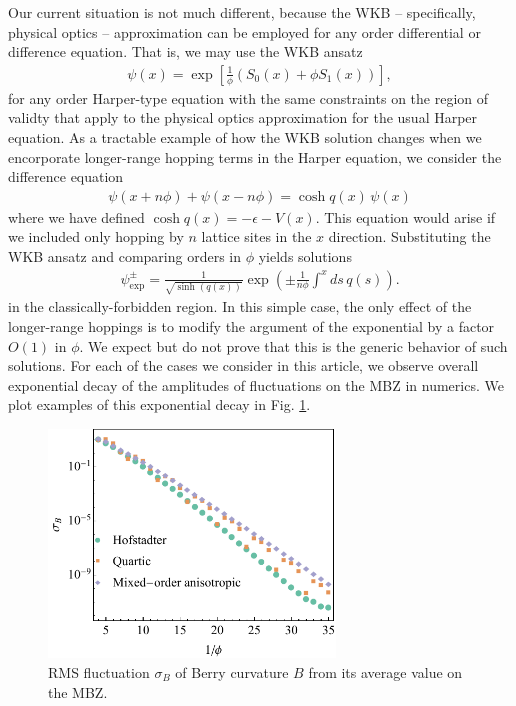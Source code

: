 \documentclass[aps,prb,twocolumn,letterpaper,twoside,nobalancelastpage,groupedaddress,amsmath,amssymb,floatfix,citeautoscript]{revtex4-1}
\begin{document}
Our current situation is not much different, because the WKB -- specifically, physical optics -- approximation can be employed for any order differential or difference equation. That is, we may use the WKB ansatz
\begin{align}
\label{wkb-ansatz}
\psi(x) = \exp\left[\frac{1}{\phi}\left(S_0(x) + \phi S_1(x)\right)\right],
\end{align}
for any order Harper-type equation with the same constraints on the region of validty that apply to the physical optics approximation for the usual Harper equation\cite{bender_advanced_1999}. 
As a tractable example of how the WKB solution changes when we encorporate longer-range hopping terms in the Harper equation, we consider the difference equation
\begin{align*}
\psi(x + n \phi) + \psi(x - n\phi) = \cosh q(x)\,\psi(x)
\end{align*}
where we have defined $\cosh q(x) = -\epsilon - V(x)$.
This equation would arise if we included only hopping by $n$ lattice sites in the $x$ direction.
Substituting the WKB ansatz and comparing orders in $\phi$ yields solutions
\begin{align*}
\psi_{\text{exp}}^{\pm} = \frac{1}{\sqrt{\sinh(q(x))}}\exp\left(\pm \frac{1}{n\phi} \int^x ds\, q(s) \right).
\end{align*}
in the classically-forbidden region. In this simple case, the only effect of the longer-range hoppings is to modify the argument of the exponential by a factor $O(1)$ in $\phi$. We expect but do not prove that this is the generic behavior of such solutions. For each of the cases we consider in this article, we observe overall exponential decay of the amplitudes of fluctuations on the MBZ in numerics. We plot examples of this exponential decay in 
Fig. \ref{rms-curv-fluct-plot}.
\begin{figure}[thb]
\centering
\includegraphics[width=3.0in]{rms-curv-fluct.pdf}
\caption{\label{rms-curv-fluct-plot}RMS fluctuation $\sigma_B$ of Berry curvature $B$ from its average value on the MBZ.}
\end{figure}
\end{document}
